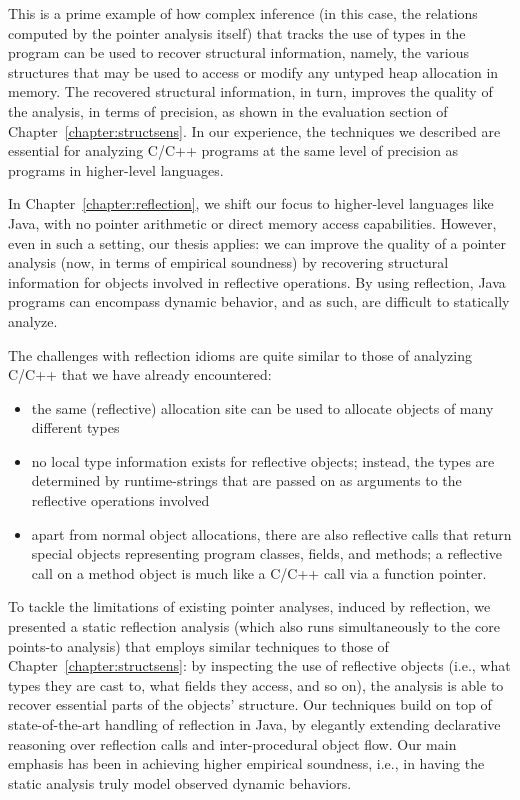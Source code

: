 This is a prime example of how complex inference (in this case, the
relations computed by the pointer analysis itself) that tracks the use
of types in the program can be used to recover structural information,
namely, the various structures that may be used to access or modify
any untyped heap allocation in memory. The recovered structural
information, in turn, improves the quality of the analysis, in terms
of precision, as shown in the evaluation section of
Chapter~\ref{chapter:structsens}. In our experience, the techniques we
described are essential for analyzing C/C++ programs at the same level
of precision as programs in higher-level languages.

In Chapter~\ref{chapter:reflection}, we shift our focus to
higher-level languages like Java, with no pointer arithmetic or direct
memory access capabilities. However, even in such a setting, our thesis
applies: we can improve the quality of a pointer analysis (now, in
terms of empirical soundness) by recovering structural information for
objects involved in reflective operations. By using reflection, Java
programs can encompass dynamic behavior, and as such, are difficult to
statically analyze.


The challenges with reflection idioms are quite similar to those of
analyzing C/C++ that we have already encountered:
\begin{itemize}[\(\cdot\)]
\item the same (reflective) allocation site can be used to allocate
  objects of many different types
\item no local type information exists for reflective objects;
  instead, the types are determined by runtime-strings that are passed
  on as arguments to the reflective operations involved
\item apart from normal object allocations, there are also reflective
  calls that return special objects representing program classes,
  fields, and methods; a reflective call on a method object is much
  like a C/C++ call via a function pointer.
\end{itemize}

To tackle the limitations of existing pointer analyses, induced by
reflection, we presented a static reflection analysis (which also runs
simultaneously to the core points-to analysis) that employs similar
techniques to those of Chapter~\ref{chapter:structsens}: by inspecting
the use of reflective objects (i.e., what types they are cast to, what
fields they access, and so on), the analysis is able to recover
essential parts of the objects' structure. Our techniques build on top
of state-of-the-art handling of reflection in Java, by elegantly
extending declarative reasoning over reflection calls and
inter-procedural object flow. Our main emphasis has been in achieving
higher empirical soundness, i.e., in having the static analysis truly
model observed dynamic behaviors.

